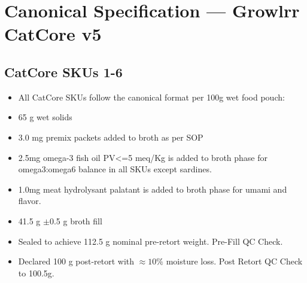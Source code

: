 \section*{Canonical Specification --- Growlrr CatCore v5}
\subsection*{CatCore SKUs 1-6}
\begin{itemize}
\item All CatCore SKUs follow the canonical format per 100g wet food pouch:
\item 65 g wet solids
\item 3.0 mg premix packets added to broth as per SOP
\item 2.5mg omega-3 fish oil PV<=5 meq/Kg is added to broth phase for omega3:omega6 balance in all SKUs except sardines.
\item 1.0mg meat hydrolysant palatant is added to broth phase for umami and flavor. 
\item 41.5 g $\pm$0.5 g broth fill
\item Sealed to achieve 112.5 g nominal pre-retort weight. Pre-Fill QC Check.
\item Declared 100 g post-retort with $\approx 10\%$ moisture loss. Post Retort QC Check to 100.5g. 
\end{itemize}

